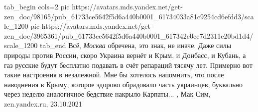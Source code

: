 
\ifcmt
  tab_begin cols=2
     pic https://avatars.mds.yandex.net/get-zen_doc/98165/pub_61733ce5642f5d6a440b0001_61734033a81c9254cd6efdd3/scale_1200
     pic https://avatars.mds.yandex.net/get-zen_doc/3965361/pub_61733ce5642f5d6a440b0001_617342e0ce7d2311e20bd1d4/scale_1200
  tab_end
\fi
Всё, \emph{Москва} обречена, это знак, не иначе. Даже силы природы против России,
скоро Украина вернёт и Крым, и Донбасс, и Кубань, а газ русские будут бесплатно
подавать в счёт репараций тясячу лет. Примерно вот такие настроения в
незалежной. Мне бы хотелось напомнить, что после наводнения в Крыму, которое
здорово обрадовало часть украинцев, буквально через неделю аналогичное бедствие
накрыло Карпаты...
, Мак Сим, zen.yandex.ru, 23.10.2021
